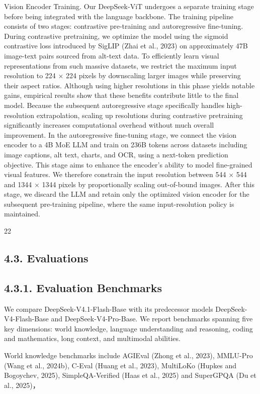 \documentclass[
  10
]{article}
\begin{document}
Vision Encoder Training. Our DeepSeek-ViT undergoes a separate training
stage before being integrated with the language backbone. The training
pipeline consists of two stages: contrastive pre-training and
autoregressive fine-tuning. During contrastive pretraining, we optimize
the model using the sigmoid contrastive loss introduced by SigLIP (Zhai
et al., 2023) on approximately 47B image-text pairs sourced from
alt-text data. To efficiently learn visual representations from such
massive datasets, we restrict the maximum input resolution to 224 $\times$ 224
pixels by downscaling larger images while preserving their aspect
ratios. Although using higher resolutions in this phase yields notable
gains, empirical results show that these benefits contribute little to
the final model. Because the subsequent autoregressive stage
specifically handles high-resolution extrapolation, scaling up
resolutions during contrastive pretraining significantly increases
computational overhead without much overall improvement. In the
autoregressive fine-tuning stage, we connect the vision encoder to a 4B
MoE LLM and train on 236B tokens across datasets including image
captions, alt text, charts, and OCR, using a next-token prediction
objective. This stage aims to enhance the encoder's ability to model
fine-grained visual features. We therefore constrain the input
resolution between 544 $\times$ 544 and 1344 $\times$ 1344 pixels by proportionally
scaling out-of-bound images. After this stage, we discard the LLM and
retain only the optimized vision encoder for the subsequent pre-training
pipeline, where the same input-resolution policy is maintained.

22

\subsection{4.3. Evaluations}\label{evaluations}

\subsection{4.3.1. Evaluation Benchmarks}\label{evaluation-benchmarks}

We compare DeepSeek-V4.1-Flash-Base with its predecessor models
DeepSeek-V4-Flash-Base and DeepSeek-V4-Pro-Base. We report benchmarks
spanning five key dimensions: world knowledge, language understanding
and reasoning, coding and mathematics, long context, and multimodal
abilities.

World knowledge benchmarks include AGIEval (Zhong et al., 2023),
MMLU-Pro (Wang et al., 2024b), C-Eval (Huang et al., 2023), MultiLoKo
(Hupkes and Bogoychev, 2025), SimpleQA-Verified (Haas et al., 2025) and
SuperGPQA (Du et al., 2025)，
\end{document}
